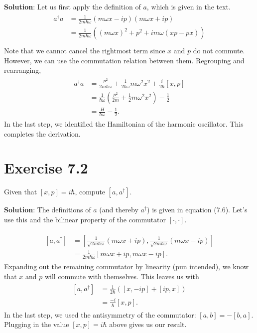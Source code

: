 \documentclass{book}
\begin{document}
    \textbf{Solution}: Let us first apply the definition of $a$, which is given in the text.
    \begin{align}
    \begin{aligned}
        a^\dagger a &= \frac{1}{2m\hbar\omega}(m\omega x-ip)(m\omega x+ip) \\
        &= \frac{1}{2m\hbar\omega} \left((m\omega x)^2 + p^2 + im\omega(xp-px)\right) \\
    \end{aligned}
    \end{align}
    Note that we cannot cancel the rightmost term since $x$ and $p$ do not commute. However, we can use the commutation relation between them. Regrouping and rearranging,
    \begin{align}
    \begin{aligned}
        a^\dagger a &= \frac{p^2}{2m\hbar\omega}+\frac{1}{2\hbar\omega}m \omega^2 x^2 + \frac{i}{2\hbar} [x,p] \\
        &= \frac{1}{\hbar\omega} \left(\frac{p^2}{2m} + \frac{1}{2}m\omega^2 x^2\right) - \frac{1}{2} \\
        &= \frac{H}{\hbar\omega}-\frac{1}{2}.
    \end{aligned}
    \end{align}
    In the last step, we identified the Hamiltonian of the harmonic oscillator. This completes the derivation.
    
\section*{Exercise 7.2}
    Given that $[x,p] = i\hbar$, compute $[a, a^\dagger]$.

    \textbf{Solution}: The definitions of $a$ (and thereby $a^\dagger$) is given in equation (7.6). Let's use this and the bilinear property of the commutator $[\cdot, \cdot]$.

    \begin{align}
    \begin{aligned}
        [a, a^\dagger] &= \left[\frac{1}{\sqrt{2m\hbar \omega}}\left(m\omega x + ip\right), \frac{1}{\sqrt{2m\hbar \omega}}\left(m\omega x - ip\right)\right] \\
        &= \frac{1}{2m\hbar \omega}\left[m\omega x + ip, m\omega x - ip\right].
    \end{aligned}
    \end{align}
    Expanding out the remaining commutator by linearity (pun intended), we know that $x$ and $p$ will commute with themselves. This leaves us with 
    \begin{align}
    \begin{aligned}
        [a, a^\dagger] &= \frac{1}{2\hbar} \left([x, -ip] + [ip,x]\right) \\
        &= \frac{-i}{\hbar}[x,p] .
    \end{aligned}
    \end{align}
    In the last step, we used the antisymmetry of the commutator: $[a,b] = -[b,a]$. Plugging in the value $[x,p] = i \hbar$ above gives us our result.
\end{document}
